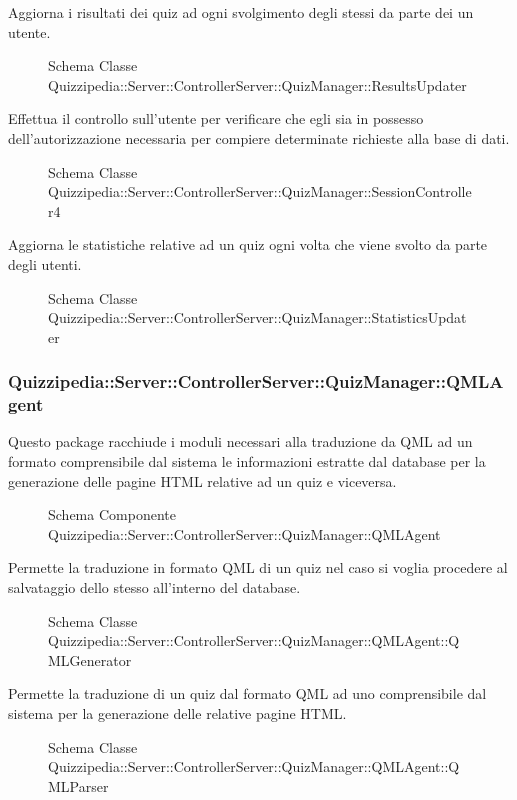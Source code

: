 Aggiorna i risultati dei quiz ad ogni svolgimento degli stessi da parte dei un utente.
\begin{figure}[H]
\centering
\noindent{}
\caption{Schema Classe Quizzipedia::Server::ControllerServer::QuizManager::ResultsUpdater}
\end{figure}
Effettua il controllo sull'utente per verificare che egli sia in possesso dell'autorizzazione necessaria per compiere determinate richieste alla base di dati.
\begin{figure}[H]
\centering
\noindent{}
\caption{Schema Classe Quizzipedia::Server::ControllerServer::QuizManager::SessionController4}
\end{figure}
Aggiorna le statistiche relative ad un quiz ogni volta che viene svolto da parte degli utenti.
\begin{figure}[H]
\centering
\noindent{}
\caption{Schema Classe Quizzipedia::Server::ControllerServer::QuizManager::StatisticsUpdater}
\end{figure}
\subsubsection{Quizzipedia::Server::ControllerServer::QuizManager::QMLAgent}
Questo package racchiude i moduli necessari alla traduzione da QML ad un formato comprensibile dal sistema le informazioni estratte dal database per la generazione delle pagine HTML relative ad un quiz e viceversa.
\begin{figure}[H]
\centering
\noindent{}
\caption{Schema Componente Quizzipedia::Server::ControllerServer::QuizManager::QMLAgent}
\end{figure}
Permette la traduzione in formato QML di un quiz nel caso si voglia procedere al salvataggio dello stesso all'interno del database.
\begin{figure}[H]
\centering
\noindent{}
\caption{Schema Classe Quizzipedia::Server::ControllerServer::QuizManager::QMLAgent::QMLGenerator}
\end{figure}
Permette la traduzione di un quiz dal formato QML ad uno comprensibile dal sistema per la generazione delle relative pagine HTML.
\begin{figure}[H]
\centering
\noindent{}
\caption{Schema Classe Quizzipedia::Server::ControllerServer::QuizManager::QMLAgent::QMLParser}
\end{figure}
